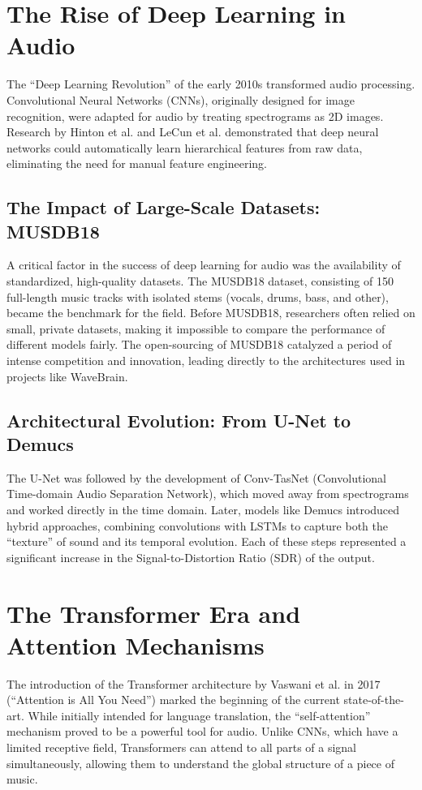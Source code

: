 \documentclass[12pt,a4paper]{article}
\begin{document}
\section{The Rise of Deep Learning in Audio}
The ``Deep Learning Revolution'' of the early 2010s transformed audio processing. Convolutional Neural Networks (CNNs), originally designed for image recognition, were adapted for audio by treating spectrograms as 2D images. Research by Hinton et al. and LeCun et al. demonstrated that deep neural networks could automatically learn hierarchical features from raw data, eliminating the need for manual feature engineering.

\subsection{The Impact of Large-Scale Datasets: MUSDB18}
A critical factor in the success of deep learning for audio was the availability of standardized, high-quality datasets. The MUSDB18 dataset, consisting of 150 full-length music tracks with isolated stems (vocals, drums, bass, and other), became the benchmark for the field. Before MUSDB18, researchers often relied on small, private datasets, making it impossible to compare the performance of different models fairly. The open-sourcing of MUSDB18 catalyzed a period of intense competition and innovation, leading directly to the architectures used in projects like WaveBrain.

\subsection{Architectural Evolution: From U-Net to Demucs}
The U-Net was followed by the development of Conv-TasNet (Convolutional Time-domain Audio Separation Network), which moved away from spectrograms and worked directly in the time domain. Later, models like Demucs introduced hybrid approaches, combining convolutions with LSTMs to capture both the ``texture'' of sound and its temporal evolution. Each of these steps represented a significant increase in the Signal-to-Distortion Ratio (SDR) of the output.

\section{The Transformer Era and Attention Mechanisms}
The introduction of the Transformer architecture by Vaswani et al. in 2017 (``Attention is All You Need'') marked the beginning of the current state-of-the-art. While initially intended for language translation, the ``self-attention'' mechanism proved to be a powerful tool for audio. Unlike CNNs, which have a limited receptive field, Transformers can attend to all parts of a signal simultaneously, allowing them to understand the global structure of a piece of music.
\end{document}
